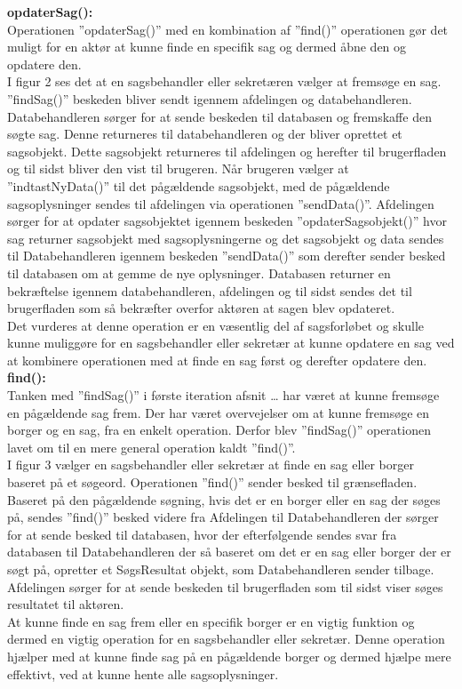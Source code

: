 \textbf{opdaterSag():} \\
Operationen ”opdaterSag()” med en kombination af ”find()” operationen gør det muligt for en aktør at kunne finde en specifik sag og dermed åbne den og opdatere den. \\
I figur 2 ses det at en sagsbehandler eller sekretæren vælger at fremsøge en sag. ”findSag()” beskeden bliver sendt igennem afdelingen og databehandleren. Databehandleren sørger for at sende beskeden til databasen og fremskaffe den søgte sag. Denne returneres til databehandleren og der bliver oprettet et sagsobjekt. Dette sagsobjekt returneres til afdelingen og herefter til brugerfladen og til sidst bliver den vist til brugeren. Når brugeren vælger at ”indtastNyData()” til det pågældende sagsobjekt, med de pågældende sagsoplysninger sendes til afdelingen via operationen ”sendData()”. Afdelingen sørger for at opdater sagsobjektet igennem beskeden ”opdaterSagsobjekt()” hvor sag returner sagsobjekt med sagsoplysningerne og det sagsobjekt og data sendes til Databehandleren igennem beskeden ”sendData()” som derefter sender besked til databasen om at gemme de nye oplysninger. Databasen returner en bekræftelse igennem databehandleren, afdelingen og til sidst sendes det til brugerfladen som så bekræfter overfor aktøren at sagen blev opdateret. \\
Det vurderes at denne operation er en væsentlig del af sagsforløbet og skulle kunne muliggøre for en sagsbehandler eller sekretær at kunne opdatere en sag ved at kombinere operationen med at finde en sag først og derefter opdatere den. \\
\textbf{find():} \\
Tanken med ”findSag()” i første iteration afsnit … har været at kunne fremsøge en pågældende sag frem. Der har været overvejelser om at kunne fremsøge en borger og en sag, fra en enkelt operation. Derfor blev ”findSag()” operationen lavet om til en mere general operation kaldt ”find()”.\\
I figur 3 vælger en sagsbehandler eller sekretær at finde en sag eller borger baseret på et søgeord. Operationen ”find()” sender besked til grænsefladen. Baseret på den pågældende søgning, hvis det er en borger eller en sag der søges på, sendes ”find()” besked videre fra Afdelingen til Databehandleren der sørger for at sende besked til databasen, hvor der efterfølgende sendes svar fra databasen til Databehandleren der så baseret om det er en sag eller borger der er søgt på, opretter et SøgsResultat objekt, som Databehandleren sender tilbage. Afdelingen sørger for at sende beskeden til brugerfladen som til sidst viser søges resultatet til aktøren. \\
At kunne finde en sag frem eller en specifik borger er en vigtig funktion og dermed en vigtig operation for en sagsbehandler eller sekretær. Denne operation hjælper med at kunne finde sag på en pågældende borger og dermed hjælpe mere effektivt, ved at kunne hente alle sagsoplysninger. \\

